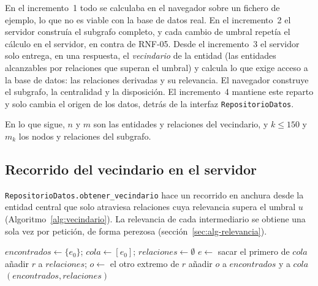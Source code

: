 En el incremento~1 todo se calculaba en el navegador sobre un fichero de ejemplo, lo que no es viable con la base de datos real. En el incremento~2 el servidor construía el subgrafo completo, y cada cambio de umbral repetía el cálculo en el servidor, en contra de RNF-05. Desde el incremento~3 el servidor solo entrega, en una respuesta, el \emph{vecindario} de la entidad (las entidades alcanzables por relaciones que superan el umbral) y calcula lo que exige acceso a la base de datos: las relaciones derivadas y su relevancia. El navegador construye el subgrafo, la centralidad y la disposición. El incremento~4 mantiene este reparto y solo cambia el origen de los datos, detrás de la interfaz \texttt{RepositorioDatos}.

En lo que sigue, $n$ y $m$ son las entidades y relaciones del vecindario, y $k\le150$ y $m_k$ los nodos y relaciones del subgrafo.

\subsection{Recorrido del vecindario en el servidor}
\label{sec:alg-vecindario}

\texttt{RepositorioDatos.obtener\_vecindario} hace un recorrido en anchura desde la entidad central que solo atraviesa relaciones cuya relevancia supera el umbral $u$ (Algoritmo~\ref{alg:vecindario}). La relevancia de cada intermediario se obtiene una sola vez por petición, de forma perezosa (sección~\ref{sec:alg-relevancia}).

\begin{algorithm}[htbp]
  \caption{Recorrido del vecindario (\texttt{obtener\_vecindario}).}
  \label{alg:vecindario}
  \begin{algorithmic}[1]
      \State $encontrados \gets \{e_0\}$; $cola \gets [e_0]$; $relaciones \gets \emptyset$
        \State $e \gets$ sacar el primero de $cola$
         
            \State añadir $r$ a $relaciones$; $o \gets$ el otro extremo de $r$
              \State añadir $o$ a $encontrados$ y a $cola$
            \EndIf
          \EndIf
        \EndFor
      \EndWhile
      \State \Return $(encontrados, relaciones)$
    \EndFunction
  \end{algorithmic}
\end{algorithm}

